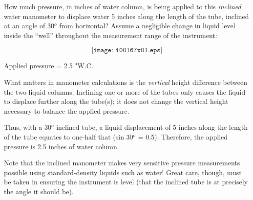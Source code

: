 

How much pressure, in inches of water column, is being applied to this {\it inclined} water manometer to displace water 5 inches along the length of the tube, inclined at an angle of 30$^{o}$ from horizontal?  Assume a negligible change in liquid level inside the ``well'' throughout the measurement range of the instrument:

$$\texttt{[image: i00167x01.eps]}$$







Applied pressure = 2.5 "W.C.

\vskip 10pt

What matters in manometer calculations is the {\it vertical} height difference between the two liquid columns.  Inclining one or more of the tubes only causes the liquid to displace further along the tube(s); it does not change the vertical height necessary to balance the applied pressure.

Thus, with a 30$^{o}$ inclined tube, a liquid displacement of 5 inches along the length of the tube equates to one-half that (sin 30$^{o}$ = 0.5).  Therefore, the applied pressure is 2.5 inches of water column.

Note that the inclined manometer makes very sensitive pressure measurements possible using standard-density liquids such as water!  Great care, though, must be taken in ensuring the instrument is level (that the inclined tube is at precisely the angle it should be).











